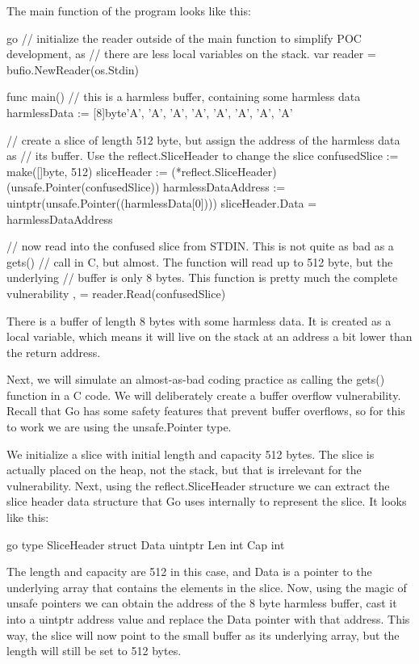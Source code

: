 The main function of the program looks like this:

go
// initialize the reader outside of the main function to simplify POC development, as
// there are less local variables on the stack.
var reader = bufio.NewReader(os.Stdin)

func main() 
    // this is a harmless buffer, containing some harmless data
    harmlessData := [8]byte'A', 'A', 'A', 'A', 'A', 'A', 'A', 'A'

    // create a slice of length 512 byte, but assign the address of the harmless data as
    // its buffer. Use the reflect.SliceHeader to change the slice
    confusedSlice := make([]byte, 512)
    sliceHeader := (*reflect.SliceHeader)(unsafe.Pointer(confusedSlice))
    harmlessDataAddress := uintptr(unsafe.Pointer((harmlessData[0])))
    sliceHeader.Data = harmlessDataAddress

    // now read into the confused slice from STDIN. This is not quite as bad as a gets()
    // call in C, but almost. The function will read up to 512 byte, but the underlying
    // buffer is only 8 bytes. This function is pretty much the complete vulnerability
    ,  = reader.Read(confusedSlice)



There is a buffer of length 8 bytes with some harmless data. It is created as a local variable, which means it will live
on the stack at an address a bit lower than the return address.

Next, we will simulate an almost-as-bad coding practice as calling the gets() function in a C code. We will
deliberately create a buffer overflow vulnerability. Recall that Go has some safety features that prevent buffer
overflows, so for this to work we are using the unsafe.Pointer type.

We initialize a slice with initial length and capacity 512 bytes. The slice is actually placed on the heap, not the
stack, but that is irrelevant for the vulnerability. Next, using the reflect.SliceHeader structure we can extract
the slice header data structure that Go uses internally to represent the slice. It looks like this:

go
type SliceHeader struct 
	Data uintptr
	Len  int
	Cap  int



The length and capacity are 512 in this case, and Data is a pointer to the underlying array that contains the elements
in the slice. Now, using the magic of unsafe pointers we can obtain the address of the 8 byte harmless buffer, cast it
into a uintptr address value and replace the Data pointer with that address. This way, the slice will now point to the
small buffer as its underlying array, but the length will still be set to 512 bytes.

